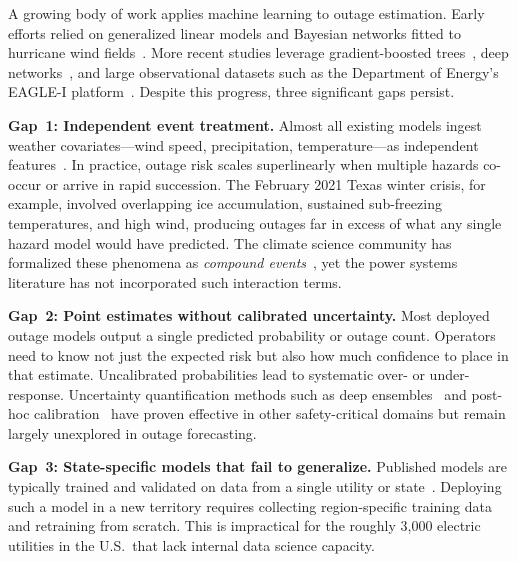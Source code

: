 \documentclass[conference]{IEEEtran}
\begin{document}
A growing body of work applies machine learning to outage estimation. Early efforts relied on generalized linear models and Bayesian networks fitted to hurricane wind fields~\cite{guikema2010prestorm,nateghi2011comparison}. More recent studies leverage gradient-boosted trees~\cite{kankanala2014adaboost,eskandarpour2017machine}, deep networks~\cite{jaech2019outage,xie2020review}, and large observational datasets such as the Department of Energy's EAGLE-I platform~\cite{brelsford2024eaglei}. Despite this progress, three significant gaps persist.

\textbf{Gap~1: Independent event treatment.} Almost all existing models ingest weather covariates---wind speed, precipitation, temperature---as independent features~\cite{cerrai2019predicting,mukherjee2018review}. In practice, outage risk scales superlinearly when multiple hazards co-occur or arrive in rapid succession. The February 2021 Texas winter crisis, for example, involved overlapping ice accumulation, sustained sub-freezing temperatures, and high wind, producing outages far in excess of what any single hazard model would have predicted. The climate science community has formalized these phenomena as \emph{compound events}~\cite{zscheischler2020compound,raymond2020understanding}, yet the power systems literature has not incorporated such interaction terms.

\textbf{Gap~2: Point estimates without calibrated uncertainty.} Most deployed outage models output a single predicted probability or outage count. Operators need to know not just the expected risk but also how much confidence to place in that estimate. Uncalibrated probabilities lead to systematic over- or under-response. Uncertainty quantification methods such as deep ensembles~\cite{lakshminarayanan2017simple} and post-hoc calibration~\cite{guo2017calibration} have proven effective in other safety-critical domains but remain largely unexplored in outage forecasting.

\textbf{Gap~3: State-specific models that fail to generalize.} Published models are typically trained and validated on data from a single utility or state~\cite{nateghi2011comparison,eskandarpour2017machine}. Deploying such a model in a new territory requires collecting region-specific training data and retraining from scratch. This is impractical for the roughly 3{,}000 electric utilities in the U.S.\ that lack internal data science capacity.
\end{document}
